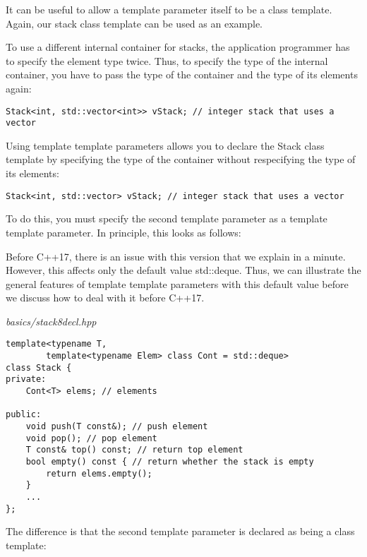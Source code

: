 It can be useful to allow a template parameter itself to be a class template. Again, our stack class template can be used as an example.

To use a different internal container for stacks, the application programmer has to specify the element type twice. Thus, to specify the type of the internal container, you have to pass the type of the container and the type of its elements again:

\begin{lstlisting}[style=styleCXX]
Stack<int, std::vector<int>> vStack; // integer stack that uses a vector
\end{lstlisting}

Using template template parameters allows you to declare the Stack class template by specifying the type of the container without respecifying the type of its elements:

\begin{lstlisting}[style=styleCXX]
Stack<int, std::vector> vStack; // integer stack that uses a vector
\end{lstlisting}

To do this, you must specify the second template parameter as a template template parameter. In principle, this looks as follows:

\begin{tcolorbox}[colback=webgreen!5!white,colframe=webgreen!75!black]
\hspace*{0.75cm}Before C++17, there is an issue with this version that we explain in a minute. However, this affects only the default value std::deque. Thus, we can illustrate the general features of template template parameters with this default value before we discuss how to deal with it before C++17.
\end{tcolorbox}

\noindent
\textit{basics/stack8decl.hpp}
\begin{lstlisting}[style=styleCXX]
template<typename T,
		template<typename Elem> class Cont = std::deque>
class Stack {
private:
	Cont<T> elems; // elements
	
public:
	void push(T const&); // push element
	void pop(); // pop element
	T const& top() const; // return top element
	bool empty() const { // return whether the stack is empty
		return elems.empty();
	}
	...
};
\end{lstlisting}

The difference is that the second template parameter is declared as being a class template:

